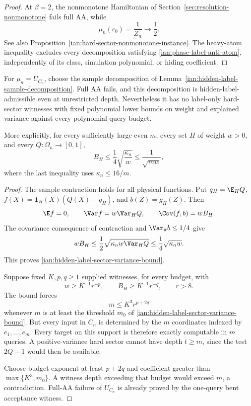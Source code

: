 \begin{proof}
At \(\beta=2\), the nonmonotone Hamiltonian of
Section~\ref{sec:resolution-nonmonotone} fails full AA, while
\[
 \mu_n(c_0)=\frac1{Z_n}\longrightarrow\frac12.
\]
See also Proposition~\ref{ian:hard-sector-nonmonotone-instance}. The heavy-atom inequality excludes every decomposition satisfying
\eqref{ian:phase-label-anti-atom}, independently of its class, simulation polynomial, or hiding coefficient.
\end{proof}

\begin{proposition}
\label{ian:hidden-label-fixed-decomposition-obstruction}
For \(\mu_n=U_{C_n}\), choose the sample decomposition of
Lemma~\ref{ian:hidden-label-sample-decomposition}. Full AA fails, and this decomposition is hidden-label-admissible even at unrestricted depth. Nevertheless it has no label-only hard-sector witnesses with fixed polynomial lower bounds on weight and explained variance against every polynomial query budget.

More explicitly, for every sufficiently large even \(m\), every set \(H\) of weight \(w>0\), and every \(Q:\Omega_n\to[0,1]\),
\[
 B_H\le\frac14\sqrt{\frac{\kappa_n}{w}}
 \le\frac1{\sqrt{mw}},
 \tag{27.3}\label{ian:hidden-label-sector-variance-bound}
\]
where the last inequality uses \(\kappa_n\le16/m\).
\end{proposition}

\begin{proof}
The sample contraction holds for all physical functions. Put
\(q_H=\E_HQ\), \(f(X)=\mathbf1_H(X)(Q(X)-q_H)\), and \(b(Z)=g_H(Z)\). Then
\[
 \E f=0,\qquad
 \Var f=w\Var_HQ,\qquad
 \Cov(f,b)=wB_H.
\]
The covariance consequence of contraction and
\(\Var_\pi b\le1/4\) give
\[
 wB_H\le\frac12\sqrt{\kappa_n w\Var_HQ}
 \le\frac14\sqrt{\kappa_n w}.
\]
This proves \eqref{ian:hidden-label-sector-variance-bound}.

Suppose fixed \(K,p,q\ge1\) supplied witnesses, for every budget, with
\[
 w\ge K^{-1}r^{-p},\qquad
 B_H\ge K^{-1}r^{-q},\qquad r>8.
\]
The bound forces
\[
 m\le K^3r^{p+2q}
\]
whenever \(m\) is at least the threshold \(m_0\) of \eqref{ian:hidden-label-sector-variance-bound}.
But every input in \(C_n\) is determined by the \(m\) coordinates indexed by \(e_1,\ldots,e_m\). Every target on this support is therefore exactly computable in \(m\) queries. A positive-variance hard sector cannot have depth \(t\ge m\), since the test \(2Q-1\) would then be available.

Choose budget exponent at least \(p+2q\) and coefficient greater than \(\max\{K^3,m_0\}\). A witness depth exceeding that budget would exceed \(m\), a contradiction. Full-AA failure of \(U_{C_n}\) is already proved by the one-query bent acceptance witness.
\end{proof}

